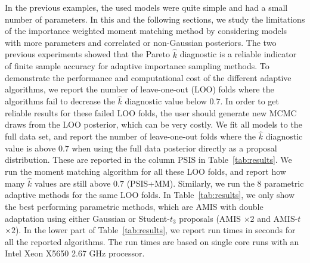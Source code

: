 \documentclass[12pt]{article}
\begin{document}
In the previous examples, the used models were quite simple and had a small 
number of parameters.
%
%
%
%
In this and the following sections, we study the limitations of the importance weighted
moment matching method by considering models with more parameters and
correlated or non-Gaussian posteriors.
The two previous experiments showed that the Pareto $\hat{k}$ diagnostic
is a reliable indicator of finite sample accuracy for adaptive importance sampling methods.
To demonstrate the performance and computational cost of the different adaptive
algorithms, we report the number of leave-one-out (LOO) folds
where the algorithms fail to decrease the $\hat{k}$ diagnostic value
below $0.7$.
In order to get reliable results for these failed LOO folds, the user should generate new MCMC
draws from the LOO posterior, which can be very costly.
We fit all models to the full data set, and report
the number of leave-one-out folds where
the $\hat{k}$ diagnostic value is above $0.7$ when using
the full data posterior directly as a proposal distribution.
These are reported in the column PSIS in Table~\ref{tab:results}.
We run the moment matching algorithm for all these LOO folds, and report
how many $\hat{k}$ values are still above $0.7$ (PSIS+MM).
Similarly, we run the 8 parametric adaptive methods for the same LOO folds.
In Table~\ref{tab:results}, we only show the best performing parametric methods, which are
AMIS with double adaptation using either Gaussian or Student-$t_3$ proposals
(AMIS $\times 2$ and AMIS-$t$ $\times 2$).
In the lower part of Table~\ref{tab:results}, we report run times in seconds for all the reported
algorithms. The run times are based on single core runs with an Intel Xeon X5650 2.67 GHz processor.
\end{document}
